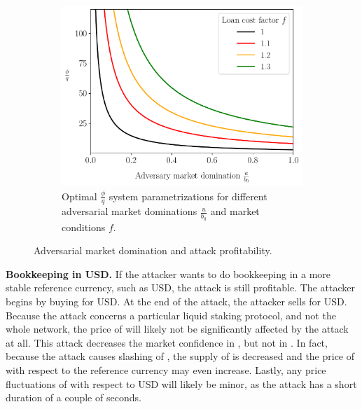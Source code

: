 
\begin{figure}[htb]
  \centering
  \hfill
  \begin{subfigure}{0.5\textwidth}
    \includegraphics[width=\textwidth]{./plots/multiplef_plotu.pdf}
    \caption{Optimal $\frac{\phi}{q}$ system parametrizations
             for different adversarial market dominations $\frac{u}{b_0}$
             and market conditions $f$.}
    \label{fig:compare-f-plotu}
  \end{subfigure}
  \caption{Adversarial market domination and attack profitability.}
  \label{fig:plotu}
\end{figure}



\noindent
\textbf{Bookkeeping in USD.}
If the attacker wants to do bookkeeping in a more stable reference currency,
such as USD, the attack is still profitable. The attacker begins by buying
\asset for USD. At the end of the attack, the attacker sells \asset for USD.
Because the attack concerns a particular liquid staking protocol, and
not the whole \asset network, the price of \asset will likely not
be significantly affected by the attack at all.
This attack decreases the market confidence in \stasset,
but not in \asset.
In fact, because
the attack causes slashing of \asset, the supply of \asset is decreased
and the price of \asset with respect to the reference currency may
even increase.
Lastly, any price fluctuations of \asset with respect to USD will likely be
minor, as the attack has a short duration of a couple of seconds.

